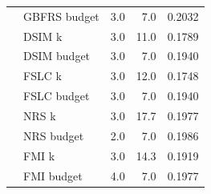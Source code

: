 \begin{table}[htbp]
\begin{tabular}{llrrr}
 & GBFRS budget & 3.0 & 7.0 & 0.2032\\
 & DSIM k & 3.0 & 11.0 & 0.1789\\
 & DSIM budget & 3.0 & 7.0 & 0.1940\\
 & FSLC k & 3.0 & 12.0 & 0.1748\\
 & FSLC budget & 3.0 & 7.0 & 0.1940\\
 & NRS k & 3.0 & 17.7 & 0.1977\\
 & NRS budget & 2.0 & 7.0 & 0.1986\\
 & FMI k & 3.0 & 14.3 & 0.1919\\
 & FMI budget & 4.0 & 7.0 & 0.1977\\
\hline
\end{tabular}\end{table}